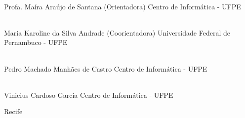 \begin{flushright}
\parbox{12cm}{

\singlespacing

\hrulefill \\

\vspace{-.4cm}
Profa. Maíra Araújo de Santana (Orientadora)
\newline
Centro de Informática - UFPE
\vspace{.7cm}

\hrulefill \\

\vspace{-.4cm}
Maria Karoline da Silva Andrade (Coorientadora)
\newline
Universidade Federal de Pernambuco - UFPE
\vspace{.7cm}

\hrulefill \\

\vspace{-.4cm}
Pedro Machado Manhães de Castro
\newline
Centro de Informática - UFPE
\vspace{.7cm}

\hrulefill \\

\vspace{-.4cm}
Vinicius Cardoso Garcia
\newline
Centro de Informática - UFPE
\vspace{.7cm}

}
\end{flushright}
\vfill

\begin{center}
Recife
\end{center}